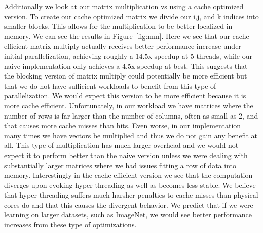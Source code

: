 Additionally we look at our matrix multiplication vs using a cache optimized
version. To create our cache optimized matrix we divide our i,j, and k indices
into smaller blocks. This allows for the multiplication to be better localized
in memory. We can see the results in Figure~\ref{fig:mm}. Here we see that our
cache efficient matrix multiply actually receives better performance increase
under initial parallelization, achieving roughly a $14.5$x speedup at 5 threads,
while our naive implementation only achieves a $4.5$x speedup at best. This
suggests that the blocking version of matrix multiply could potentially be more
efficient but that we do not have sufficient workloads to benefit from this type
of parallelization. We would expect this version to be more efficient because it
is more cache efficient. Unfortunately, in our workload we have matrices where
the number of rows is far larger than the number of columns, often as small as
2, and that causes more cache misses than hits. Even worse, in our
implementation many times we have vectors be multiplied and thus we do not gain
any benefit at all. This type of multiplication has much larger overhead and we
would not expect it to perform better than the naive version unless we were
dealing with substantially larger matrices where we had issues fitting a row of
data into memory. Interestingly in the cache efficient version we see that the
computation diverges upon evoking hyper-threading as well as becomes less
stable. We believe that hyper-threading suffers much harsher penalties to cache
misses than physical cores do and that this causes the divergent behavior. We
predict that if we were learning on larger datasets, such as ImageNet, we would
see better performance increases from these type of optimizations. 


